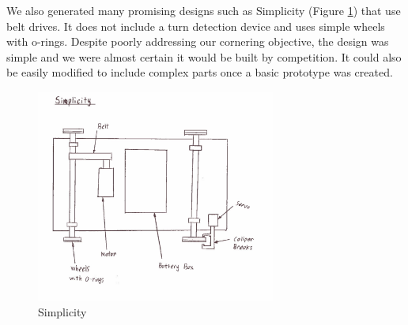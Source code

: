 \documentclass[class=../report, crop=false]{standalone}
\begin{document}
\clearpage

We also generated many promising designs such as Simplicity (Figure \ref{fig:simplicity}) that use belt drives.
It does not include a turn detection device and uses simple wheels with o-rings.
Despite poorly addressing our cornering objective, the design was simple and we were almost certain it would be built by competition.
It could also be easily modified to include complex parts once a basic prototype was created.

\begin{figure}[H]
	\centering
	\includegraphics[width=0.7\textwidth]{../res/img/simplicity}
	\caption{Simplicity}
	\label{fig:simplicity}
\end{figure}
\end{document}
